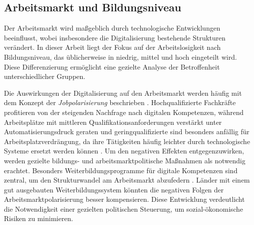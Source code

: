 
\subsection{Arbeitsmarkt und Bildungsniveau}

Der Arbeitsmarkt wird maßgeblich durch technologische Entwicklungen beeinflusst,
wobei insbesondere die Digitalisierung bestehende Strukturen verändert. In dieser
Arbeit liegt der Fokus auf der Arbeitslosigkeit nach Bildungsniveau, das üblicherweise
in niedrig, mittel und hoch eingeteilt wird. Diese Differenzierung ermöglicht eine 
gezielte Analyse der Betroffenheit unterschiedlicher Gruppen.

Die Auswirkungen der Digitalisierung auf den Arbeitsmarkt werden häufig mit dem
Konzept der \textit{Jobpolarisierung} beschrieben 
\parencite[vgl.][S. 12]{autor2015whyare}. Hochqualifizierte Fachkräfte profitieren von 
der steigenden Nachfrage nach digitalen Kompetenzen, während Arbeitsplätze mit 
mittleren Qualifikationsanforderungen verstärkt unter Automatisierungsdruck geraten und 
geringqualifizierte sind besonders anfällig 
für Arbeitsplatzverdrängung, da ihre Tätigkeiten häufig leichter durch technologische 
Systeme ersetzt werden können \parencite[vgl.][S. 10]{acemoglu2002technical}.
Um den negativen Effekten entgegenzuwirken, werden gezielte bildungs- und
arbeitsmarktpolitische Maßnahmen als notwendig erachtet. Besonders
Weiterbildungsprogramme für digitale Kompetenzen sind zentral, um den
Strukturwandel am Arbeitsmarkt abzufedern 
\parencite[vgl.][Kap. 13]{brynjolfsson2014thesecond}. Länder mit einem gut ausgebauten 
Weiterbildungssystem könnten die negativen Folgen der Arbeitsmarktpolarisierung besser 
kompensieren. Diese Entwicklung verdeutlicht die Notwendigkeit einer gezielten 
politischen Steuerung, um sozial-ökonomische Risiken zu minimieren.

